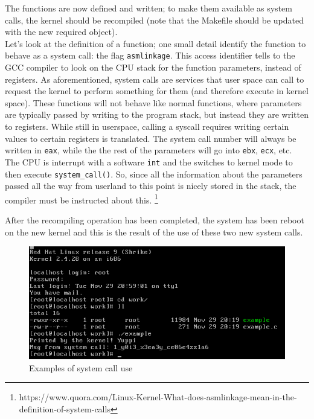 \documentclass{article}
\begin{document}
The functions are now defined and written; to make them available as system calls, the kernel should be recompiled (note that the Makefile should
be updated with the new required object).\\

Let's look at the definition of a function; one small detail identify the function to behave as a system call: the flag \texttt{asmlinkage}.
This access identifier tells to the GCC compiler to look on the CPU stack for the function parameters, instead of registers.
As aforementioned, system calls are services that user space can call to request the kernel to perform something for them (and therefore execute in kernel space). 
These functions will not behave like normal functions, where parameters are typically passed by writing to the program stack, but instead they are written to registers.
While still in userspace, calling a syscall requires writing certain values to certain registers is translated.
The system call number will always be written in \texttt{eax}, while the the rest of the parameters will go into \texttt{ebx}, \texttt{ecx}, etc. 
The CPU is interrupt with a software \texttt{int} and the switches to kernel mode to then execute \texttt{system\_call()}.
So, since all the information about the parameters passed all the way from userland to this point is nicely stored in the stack, the compiler must be instructed about this.
\let\thefootnote\relax\footnote{https://www.quora.com/Linux-Kernel-What-does-asmlinkage-mean-in-the-definition-of-system-calls}

After the recompiling operation has been completed, the system has been reboot on the new kernel and this is the result of the use of these two new system calls.

\begin{figure}
  \centering
  \includegraphics[width=\textwidth]{./result.png}
  \caption{Examples of system call use}
\end{figure}
\end{document}
